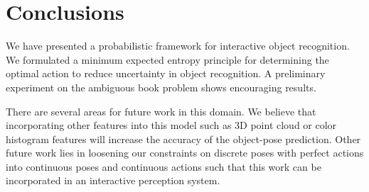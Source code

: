 \section{Conclusions}

We have presented a probabilistic framework for interactive object recognition. We formulated a minimum expected entropy principle for determining the optimal action to reduce uncertainty in object recognition. A preliminary experiment on the ambiguous book problem shows encouraging results.

    There are several areas for future work in this domain. We believe that incorporating other features into this model such as 3D point cloud or color histogram features will increase the accuracy of the object-pose prediction.
    Other future work lies in loosening our constraints on discrete poses with perfect actions into continuous poses and continuous actions such that this work can be incorporated in an interactive perception system.

   